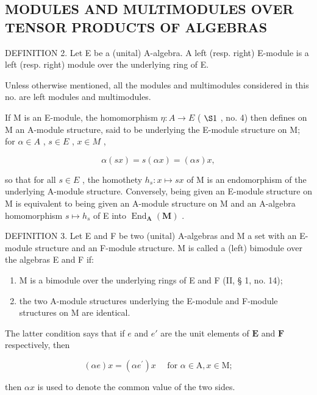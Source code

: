 \subsection{MODULES AND MULTIMODULES OVER TENSOR PRODUCTS OF ALGEBRAS}

DEFINITION 2. Let E be a (unital) A-algebra. A left (resp. right) E-module is a left (resp. right) module over the underlying ring of E.

Unless otherwise mentioned, all the modules and multimodules considered in this no. are left modules and multimodules.

If M is an E-module, the homomorphism \(\eta: A \to E\) ( \(\S 1\) , no. 4) then defines on M an A-module structure, said to be underlying the E-module structure on M; for \(\alpha \in A\) , \(s \in E\) , \(x \in M\) ,

\[
\alpha (s x) = s (\alpha x) = (\alpha s) x,\tag{7}
\]

so that for all \(s \in E\) , the homothety \(h_{s}: x \mapsto sx\) of M is an endomorphism of the underlying A-module structure. Conversely, being given an E-module structure on M is equivalent to being given an A-module structure on M and an A-algebra homomorphism \(s \mapsto h_{s}\) of E into \(\operatorname{End}_{\mathbf{A}}(\mathbf{M})\) .

DEFINITION 3. Let E and F be two (unital) A-algebras and M a set with an E-module structure and an F-module structure. M is called a (left) bimodule over the algebras E and F if:

\begin{enumerate}
\def\labelenumi{(\arabic{enumi})}
\item
  M is a bimodule over the underlying rings of E and F (II, § 1, no. 14);
\item
  the two A-module structures underlying the E-module and F-module structures on M are identical.
\end{enumerate}

The latter condition says that if \(e\) and \(e'\) are the unit elements of \(\mathbf{E}\) and \(\mathbf{F}\) respectively, then

\[
(\alpha e) x = (\alpha e ^ {\prime}) x \quad \text { for } \alpha \in \mathrm{A}, x \in \mathrm{M};\tag{8}
\]

then \(\alpha x\) is used to denote the common value of the two sides.

